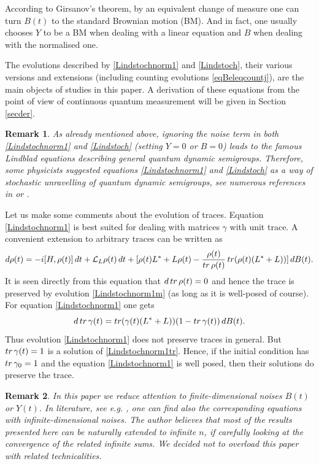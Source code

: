 \documentclass[10pt,a4paper]{amsart}
\def\LC{\mathcal{L}}
\def\tr{\rm{tr}}
\def\ga{\gamma}
\newtheorem{remark}{Remark}
\begin{document}
According to Girsanov's theorem, by an equivalent change of measure one can turn $B(t)$
to the standard Brownian motion (BM). And in fact, one usually chooses $Y$ to be a BM when dealing with a linear
equation and $B$ when dealing with the normalised one.

The evolutions described by \eqref{Lindstochnorm1} and  \eqref{Lindstoch},
their various versions and extensions (including counting evolutions \eqref{eqBeleqcountj}),
are the main objects of studies in this paper.
A derivation of these equations from the point of view of continuous quantum measurement
will be given in Section \ref{secder}.

\begin{remark}
As already mentioned above,
ignoring the noise term in both \eqref{Lindstochnorm1} and \eqref{Lindstoch}
(setting $Y=0$ or $B=0$) leads to
the famous Lindblad equations describing general quantum dynamic semigroups. Therefore, some physicists suggested
equations \eqref{Lindstochnorm1} and \eqref{Lindstoch} as a way of stochastic unravelling of quantum dynamic semigroups,
see numerous references in \cite{Mora13} or \cite{Breuer}.
\end{remark}

Let us make some comments about the evolution of traces.
Equation \eqref{Lindstochnorm1} is best suited for dealing with matrices $\ga$ with unit trace.
A convenient extension to arbitrary traces can be written as
\begin{equation}
\label{Lindstochnorm1m}
d\rho(t)=-i[H,\rho(t)]\, dt +\LC_L \rho(t)\, dt
+[\rho(t)L^*+L\rho(t)-\frac{\rho(t)}{{\tr} \, \rho(t)} \, {\tr} (\rho(t)(L^*+L))]\, dB(t).
\end{equation}
It is seen directly from this equation that $d\, {\tr} \, \rho(t)=0$ and hence the trace is preserved
by evolution \eqref{Lindstochnorm1m} (as long as it is well-posed of course).
For equation \eqref{Lindstochnorm1} one gets
 \begin{equation}
\label{Lindstochnorm1tr}
d\, {\tr} \, \ga(t)= {\tr} (\ga(t)(L^*+L))(1-  {\tr} \, \ga(t)) \, dB(t).
\end{equation}
Thus  evolution \eqref{Lindstochnorm1} does not preserve traces in general. But
${\tr} \, \ga(t)=1$ is a solution of \eqref{Lindstochnorm1tr}. Hence, if the initial
condition has  ${\tr} \, \ga_0=1$ and the equation \eqref{Lindstochnorm1} is well posed, then
their solutions do preserve the trace.

\begin{remark}
In this paper we reduce attention to finite-dimensional noises $B(t)$ or $Y(t)$.
In literature, see e.g. \cite{MoraRebo}, one can find also the corresponding equations
with infinite-dimensional noises. The author believes that most of the results presented
here can be naturally extended to infinite $n$, if carefully looking at the convergence
of the related infinite sums. We decided not to overload this paper
with related technicalities.
\end{remark}
\end{document}
